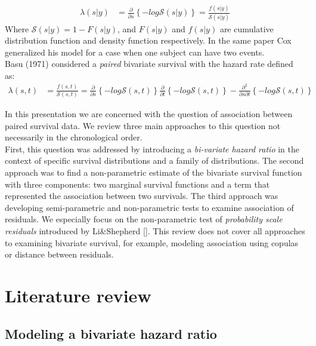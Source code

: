 \documentclass[]{article}
\begin{document}
$$
\begin{aligned}
	\lambda(s|y) &= \frac{\partial}{\partial s}\left\{  -log \mathcal{S}(s|y)  \right\} =
	             \frac{f(s|y)}{\mathcal{S}(s|y)}
\end{aligned}
$$
Where $\mathcal{S}(s|y) = 1-F(s|y)$, and $F(s|y)$ and $f(s|y)$ are cumulative distribution function and density function respectively. In the same paper %
Cox generalized his model for a case when one subject can have two events.\\
Basu (1971) %
considered a \emph{paired} bivariate survival with the hazard rate defined as:
$$
\begin{aligned}
	\lambda(s,t) &= \frac{f(s,t)}{\mathcal{S}(s,t)} = \frac{\partial}{\partial s}\left\{  -log \mathcal{S}(s,t)  \right\}\frac{\partial}{\partial t}\left\{  -log \mathcal{S}(s,t)  \right\} - \frac{\partial^2}{\partial s\partial t}\left\{  -log \mathcal{S}(s,t)  \right\}
\end{aligned}
$$

In this presentation we are concerned with the question of association between paired survival data. We review three main approaches to this question not necessarily in the chronological order.\\
First, this question was addressed by introducing a \emph{bi-variate hazard ratio} in the context of specific survival distributions and a family of distributions. The second approach was to find a non-parametric estimate of the bivariate survival function with three components: two marginal survival functions and a term that represented the association between two survivals. The third approach was developing semi-parametric and non-parametric tests to examine association of residuals. We especially focus on the non-parametric test of \emph{probability scale residuals} introduced by Li\&Shepherd [\cite{li2012new}]. This review does not cover all approaches to examining bivariate survival, for example, modeling association using copulas or distance between residuals. 

\section{Literature review}
\subsection{Modeling a bivariate hazard ratio}
\end{document}
